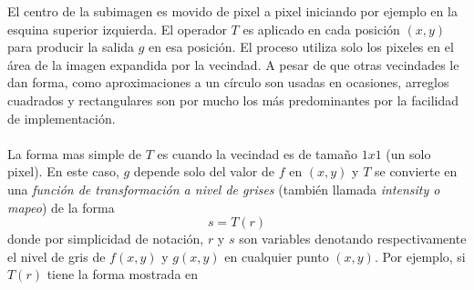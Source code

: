 			El centro de la subimagen es movido de pixel a pixel iniciando por ejemplo en la esquina superior izquierda. El operador $T$ es aplicado en cada posición $(x,y)$ para producir la salida $g$ en esa posición. El proceso utiliza solo los pixeles en el área de la imagen expandida por la vecindad. A pesar de que otras vecindades le dan forma, como aproximaciones a un círculo son usadas en ocasiones, arreglos cuadrados y rectangulares son por mucho los más predominantes por la facilidad de implementación.
			\\\\%
			La forma mas simple de $T$ es cuando la vecindad es de tamaño $1x1$ (un solo pixel). En este caso, $g$ depende solo del valor de $f$ en $(x,y)$ y $T$ se convierte en una \textit{función de transformación a nivel de grises} (también llamada \textit{intensity o mapeo}) de la forma
			\begin{equation}
				s = T(r)
			\end{equation}
			donde por simplicidad de notación, $r$ y $s$ son variables denotando respectivamente el nivel de gris de $f(x,y)$ y $g(x,y)$ en cualquier punto $(x,y)$. Por ejemplo, si $T(r)$ tiene la forma mostrada en %

